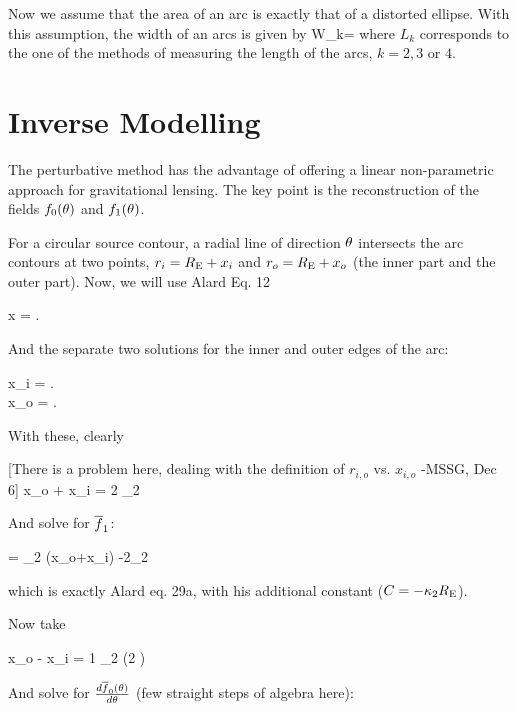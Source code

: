 Now we assume that the area of an arc is exactly that of a distorted
ellipse. With this assumption, the width of an arcs is given by
\beq
W_k=
\eeq
where $L_k$ corresponds to the one of the methods of measuring the length of the arcs, $k=2,3$ or
$4$. 


\section{Inverse Modelling}

The perturbative method has the advantage of offering a linear non-parametric
approach for gravitational lensing. The key point is the reconstruction of the
fields $f_0(\theta)$ and $f_1(\theta)$.


For a circular source contour, a radial line of direction $\theta$ intersects
the arc contours at two points, $r_i=R_{\mathrm{E}}+x_i$ and $r_o=R_{\mathrm{E}}+x_o$ (the inner part and
the outer part). Now, we will use Alard Eq. 12

\beq
x = . \;\;\;
\eeq

And the separate two solutions for the inner and outer edges of the arc:


\bea
x_i = . \;\;\;  \\
x_o = . \;\;\;
\eea


With these, clearly

[There is a problem here, dealing with the definition of $r_{i,o}$ vs. $x_{i,o}$ -MSSG, Dec 6]
\beq
x_o + x_i  = {2 \over \kappa_2} \re
\eeq

And solve for $\overline{f}_1$:


\beq
\fbar = {\kappa_2 } (x_o+x_i) -2\kappa_2 \re
\eeq

which is exactly Alard eq. 29a, with his additional constant ($C=-\kappa_2R_{\mathrm{E}}$).

Now take

\beq
x_o - x_i = {1 \over \kappa_2} \left(2 \right)
\eeq

And solve for ${d \overline{f}_0(\theta) \over d \theta}$ (few straight steps of algebra here):

